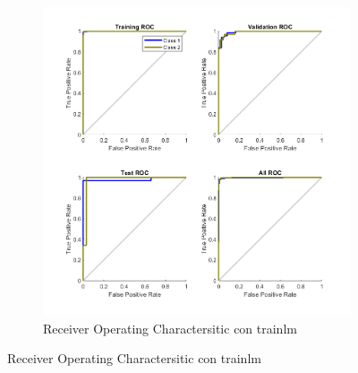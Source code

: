 \documentclass[a4paper, 12pt]{article}
\begin{document}
\begin{figure}[htp!]
\begin{subfigure}{0.49\textwidth}
                        \includegraphics[width=\textwidth]{figures/parte1/Ej4/ej4_roc_trainlm.png}
                        \caption{Receiver Operating Charactersitic con trainlm}
                    \end{subfigure}
                \end{figure}

            \newpage
\end{document}
